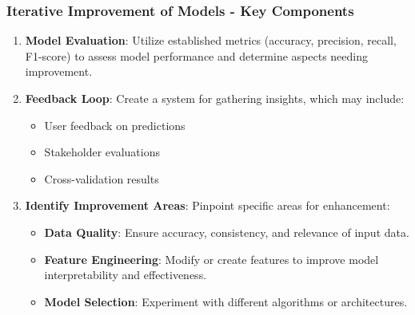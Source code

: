 \documentclass[aspectratio=169]{beamer}
\begin{document}
\begin{frame}[fragile]
  \frametitle{Iterative Improvement of Models - Key Components}
  \begin{enumerate}
    \item \textbf{Model Evaluation}: 
    Utilize established metrics (accuracy, precision, recall, F1-score) to assess model performance and determine aspects needing improvement.
    
    \item \textbf{Feedback Loop}: 
    Create a system for gathering insights, which may include:
    \begin{itemize}
      \item User feedback on predictions
      \item Stakeholder evaluations
      \item Cross-validation results
    \end{itemize}
    
    \item \textbf{Identify Improvement Areas}: 
    Pinpoint specific areas for enhancement:
    \begin{itemize}
      \item \textbf{Data Quality}: Ensure accuracy, consistency, and relevance of input data.
      \item \textbf{Feature Engineering}: Modify or create features to improve model interpretability and effectiveness.
      \item \textbf{Model Selection}: Experiment with different algorithms or architectures.
    \end{itemize}
  \end{enumerate}
\end{frame}
\end{document}

